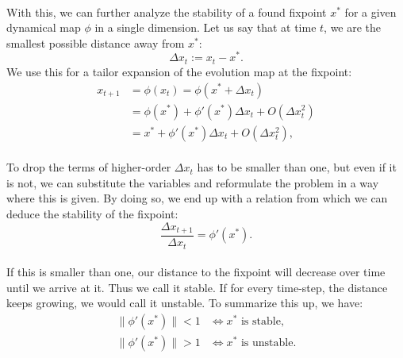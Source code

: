 \paragraph*{}
With this, we can further analyze the stability of a found fixpoint $x^*$ for a given dynamical map $\phi$ in a single dimension. Let us say that at time $t$, we are the smallest possible distance away from $x^*$:
\begin{equation}
\Delta x_t := x_t-x^*.
\end{equation}
We use this for a tailor expansion of the evolution map at the fixpoint:
\begin{equation}
\begin{split}
x_{t+1}& = \phi(x_t) = \phi(x^*+\Delta x_t)\\
& = \phi(x^*) + \phi'(x^*)\Delta x_t + O(\Delta x_t^2)\\
& = x^* + \phi'(x^*)\Delta x_t + O(\Delta x_t^2),
\end{split}
\end{equation}

\paragraph*{}
To drop the terms of higher-order $\Delta x_t$ has to be smaller than one, but even if it is not, we can substitute the variables and reformulate the problem in a way where this is given. By doing so, we end up with a relation from which we can deduce the stability of the fixpoint: 
\begin{equation}
\frac{\Delta x_{t+1}}{\Delta x_{t}} = \phi'(x^*).
\end{equation}

\paragraph*{}
If this is smaller than one, our distance to the fixpoint will decrease over time until we arrive at it. Thus we call it stable. If for every time-step, the distance keeps growing, we would call it unstable. To summarize this up, we have:
\begin{equation}\label{eq:fixpoint_stability}
\begin{split}
\|\phi'(x^*)\| < 1 & \Longleftrightarrow x^* \text{ is stable,} \\
\|\phi'(x^*)\| > 1 & \Longleftrightarrow x^* \text{ is unstable.}
\end{split}
\end{equation}

